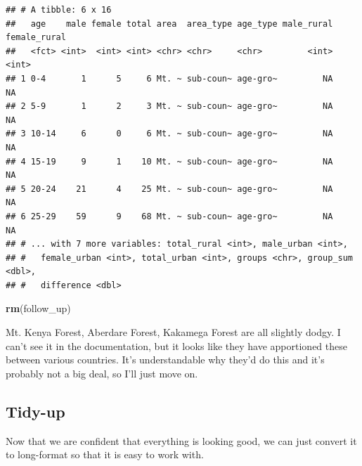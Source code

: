 \documentclass[
]{book}
\newenvironment{Shaded}{\begin{snugshade}}{\end{snugshade}}
\newcommand{\KeywordTok}[1]{\textcolor[rgb]{0.13,0.29,0.53}{\textbf{#1}}}
\newcommand{\NormalTok}[1]{#1}
\begin{document}
\begin{verbatim}
## # A tibble: 6 x 16
##   age    male female total area  area_type age_type male_rural female_rural
##   <fct> <int>  <int> <int> <chr> <chr>     <chr>         <int>        <int>
## 1 0-4       1      5     6 Mt. ~ sub-coun~ age-gro~         NA           NA
## 2 5-9       1      2     3 Mt. ~ sub-coun~ age-gro~         NA           NA
## 3 10-14     6      0     6 Mt. ~ sub-coun~ age-gro~         NA           NA
## 4 15-19     9      1    10 Mt. ~ sub-coun~ age-gro~         NA           NA
## 5 20-24    21      4    25 Mt. ~ sub-coun~ age-gro~         NA           NA
## 6 25-29    59      9    68 Mt. ~ sub-coun~ age-gro~         NA           NA
## # ... with 7 more variables: total_rural <int>, male_urban <int>,
## #   female_urban <int>, total_urban <int>, groups <chr>, group_sum <dbl>,
## #   difference <dbl>
\end{verbatim}

\begin{Shaded}
\begin{Highlighting}[]
\KeywordTok{rm}\NormalTok{(follow_up)}
\end{Highlighting}
\end{Shaded}

Mt. Kenya Forest, Aberdare Forest, Kakamega Forest are all slightly dodgy. I can't see it in the documentation, but it looks like they have apportioned these between various countries. It's understandable why they'd do this and it's probably not a big deal, so I'll just move on.

\hypertarget{tidy-up}{%
\subsection{Tidy-up}\label{tidy-up}}

Now that we are confident that everything is looking good, we can just convert it to long-format so that it is easy to work with.
\end{document}

